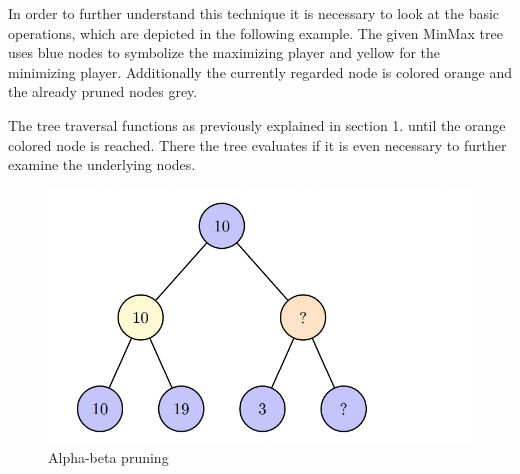 \documentclass[conference,pdf,table,xcdraw, utf8]{IEEEtran}
\begin{document}
In order to further understand this technique it is necessary to look at the basic operations, which are depicted in the following example. The given MinMax tree uses blue nodes to symbolize the maximizing player and yellow for the minimizing player. Additionally the currently regarded node is colored orange and the already pruned nodes grey.

The tree traversal functions as previously explained in section 1. until the orange colored node is reached. There the tree evaluates if it is even necessary to further examine the underlying nodes.

\vspace{1em}
\newcommand{\Rect}[1]{ \begin{tikzpicture}
        \tikzset{byte/.append style={rectangle,
                    draw=black, fill=white,
                    minimum width=0.75cm,
                    minimum height=1cm,
                    anchor=north west,
                    align=center, font=\scriptsize}}
        \node[rectangle,draw] (r) at (0,0) {a= ; b= };
    \end{tikzpicture}}


\newcommand{\MaxNode}[1]{\Tcircle[fillstyle=solid,fillcolor=blue!20]{\makebox[2em] {#1}}}
\newcommand{\MinNode}[1]{\Tcircle[fillstyle=solid,fillcolor=yellow!20]{\makebox[2em] {#1}}}
\newcommand{\CurrentNode}[1]{\Tcircle[fillstyle=solid,fillcolor=orange!20]{\makebox[2em] {#1}}}
\newcommand{\PrunedNode}[1]{\Tcircle[fillstyle=solid,fillcolor=grey!20]{\makebox[2em] {#1}}}
\newcommand{\TestNode}[1]{
    \Tcircle[fillstyle=solid,fillcolor=grey!20]{
        \begin{tikzpicture}
            \draw (0,0) circle (2em);
            \draw (-2em,0) rectangle (2,0.5);
            \node[fillstyle=solid,fillcolor=grey!20]{{#1}}
        \end{tikzpicture}
    }
}

\begin{figure}[H]
    \centering
    \includegraphics[scale=0.335]{images/pruning_tree1.png}
    \caption{Alpha-beta pruning}
    \label{figure:pruning1}
\end{figure}
\end{document}
